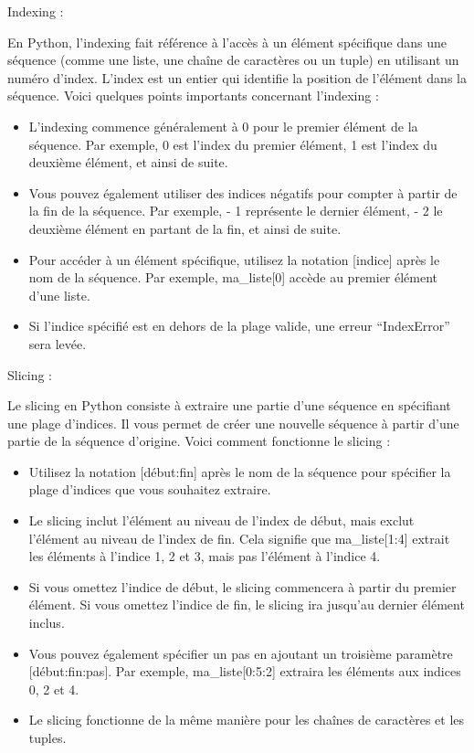 \documentclass[11pt]{article}
\providecommand{\tightlist}{%
      \setlength{\itemsep}{0pt}\setlength{\parskip}{0pt}}
\begin{document}
Indexing :

En Python, l'indexing fait référence à l'accès à un élément spécifique
dans une séquence (comme une liste, une chaîne de caractères ou un
tuple) en utilisant un numéro d'index. L'index est un entier qui
identifie la position de l'élément dans la séquence. Voici quelques
points importants concernant l'indexing :

\begin{itemize}
\tightlist
\item
  L'indexing commence généralement à 0 pour le premier élément de la
  séquence. Par exemple, 0 est l'index du premier élément, 1 est l'index
  du deuxième élément, et ainsi de suite.
\item
  Vous pouvez également utiliser des indices négatifs pour compter à
  partir de la fin de la séquence. Par exemple, - 1 représente le
  dernier élément, - 2 le deuxième élément en partant de la fin, et
  ainsi de suite.
\item
  Pour accéder à un élément spécifique, utilisez la notation
  {[}indice{]} après le nom de la séquence. Par exemple,
  ma\_liste{[}0{]} accède au premier élément d'une liste.
\item
  Si l'indice spécifié est en dehors de la plage valide, une erreur
  ``IndexError'' sera levée.
\end{itemize}

Slicing :

Le slicing en Python consiste à extraire une partie d'une séquence en
spécifiant une plage d'indices. Il vous permet de créer une nouvelle
séquence à partir d'une partie de la séquence d'origine. Voici comment
fonctionne le slicing :

\begin{itemize}
\tightlist
\item
  Utilisez la notation {[}début:fin{]} après le nom de la séquence pour
  spécifier la plage d'indices que vous souhaitez extraire.
\item
  Le slicing inclut l'élément au niveau de l'index de début, mais exclut
  l'élément au niveau de l'index de fin. Cela signifie que
  ma\_liste{[}1:4{]} extrait les éléments à l'indice 1, 2 et 3, mais pas
  l'élément à l'indice 4.
\item
  Si vous omettez l'indice de début, le slicing commencera à partir du
  premier élément. Si vous omettez l'indice de fin, le slicing ira
  jusqu'au dernier élément inclus.
\item
  Vous pouvez également spécifier un pas en ajoutant un troisième
  paramètre {[}début:fin:pas{]}. Par exemple, ma\_liste{[}0:5:2{]}
  extraira les éléments aux indices 0, 2 et 4.
\item
  Le slicing fonctionne de la même manière pour les chaînes de
  caractères et les tuples.
\end{itemize}
\end{document}
